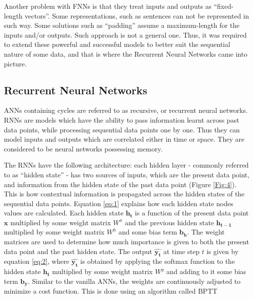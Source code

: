 Another problem with \ac{FNN}s is that they treat inputs and outputs as \enquote{fixed-length vectors}. Some representations, such as sentences can not be represented in such way. Some  solutions such as \enquote{padding} assume a maximum-length for the inputs and/or outputs. Such approach is not a general one. 
Thus, it was required to extend these powerful and successful models to better suit the sequential nature of some data, and that is where the Recurrent Neural Networks came into picture.


\subsection{Recurrent Neural Networks} 
\label{bg:s2_sub2}


\ac{ANN}s containing cycles are referred to as recursive, or recurrent neural networks. \ac{RNN}s are models which have the ability to pass information learnt across past data points, while processing sequential data points one by one. Thus they can model inputs and outputs which are correlated either in time or space. They are considered to be neural networks possessing memory.


The \ac{RNN}s have the following architecture: each hidden layer - commonly referred to as \enquote{hidden state} - has two sources of inputs, which are the present data point, and information from the hidden state of the past data point (Figure \ref{Fig:4}). This is how contextual information is propagated across the hidden states of the sequential data points. 
Equation \ref{eq:1} explains how each hidden state nodes values are calculated. Each hidden state $ \mathbf{h_t} $ is a function of the present data point $ \mathbf{x} $ multiplied by some weight matrix $ W^x $ and the previous hidden state $ \mathbf{h_{t-1}} $ multiplied by some weight matrix $ W^h $ and some bias term $ \mathbf{b_h} $. The weight matrices are used to determine how much importance is given to both the present data point and the past hidden state. The output $ \mathbf{\widehat{y_t}} $ at time step $ t $ is given by equation \ref{eq:2}, where $ \mathbf{\widehat{y_t}} $ is obtained by applying the softmax function to the hidden state $  \mathbf{h_t} $ multiplied by some weight matrix $ W^y $ and adding to it some bias term $ \mathbf{b_y} $. Similar to the vanilla \ac{ANN}s, the weights are continuously adjusted to minimize a cost function. This is done using an algorithm called \ac{BPTT} \cite{werbos1990backpropagation}


